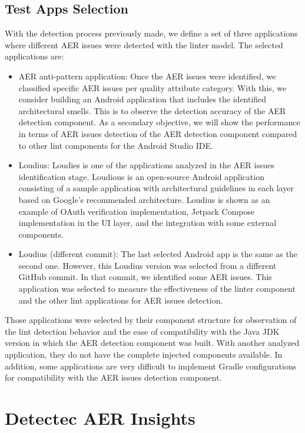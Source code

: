 \subsection{Test Apps Selection}
With the detection process previously made, we define a set of three applications where different AER issues were detected with the linter model. The selected applications are:

\begin{itemize}
	\item AER anti-pattern application: Once the AER issues were identified, we classified specific AER issues per quality attribute category. With this, we consider building an Android application that includes the identified architectural smells. This is to observe the detection accuracy of the AER detection component. As a secondary objective, we will show the performance in terms of AER issues detection of the AER detection component compared to other lint components for the Android Studio IDE.
	\item Loudius: Loudies is one of the applications analyzed in the AER issues identification stage. Loudious is an open-source Android application consisting of a sample application with architectural guidelines in each layer based on Google's recommended architecture. Loudius is shown as an example of OAuth verification implementation, Jetpack Compose implementation in the UI layer, and the integration with some external components.
	\item Loudius (different commit): The last selected Android app is the same as the second one. However, this Loudius version was selected from a different GitHub commit. In that commit, we identified some AER issues. This application was selected to measure the effectiveness of the linter component and the other lint applications for AER issues detection.
\end{itemize}

Those applications were selected by their component structure for observation of the lint detection behavior and the ease of compatibility with the Java JDK version in which the AER detection component was built. With another analyzed application, they do not have the complete injected components available. In addition, some applications are very difficult to implement Gradle configurations for compatibility with the AER issues detection component.
\section{Detectec AER Insights}
